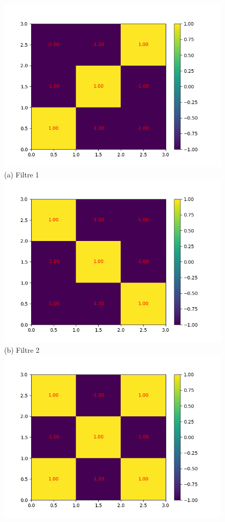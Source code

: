 \begin{figure}[!htb]
        \includegraphics[width=\textwidth]{img/cnn_exemple/square/filtre_1.png}
        \center 
        (a) Filtre 1
    \endminipage\hfill
        \includegraphics[width=\textwidth]{img/cnn_exemple/square/filtre_2.png}
        \center 
        (b) Filtre 2
    \endminipage\hfill
        \includegraphics[width=\textwidth]{img/cnn_exemple/square/filtre_3.png}

\end{figure}
